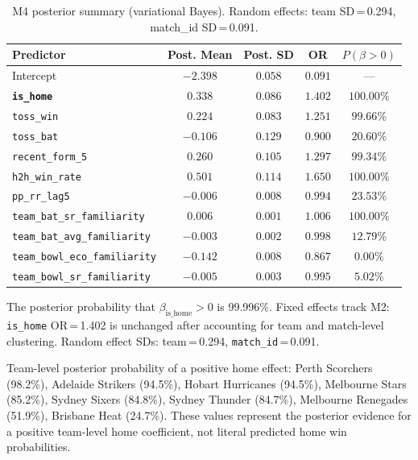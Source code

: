 \documentclass[12pt,a4paper]{article}
\begin{document}
\begin{table}[H]
\centering
\caption{M4 posterior summary (variational Bayes). Random effects: team SD\,=\,0.294, match\_id SD\,=\,0.091.}
\label{tab:m4}
\small
\begin{tabular}{lcccc}
\toprule
\textbf{Predictor} & \textbf{Post. Mean} & \textbf{Post. SD} & \textbf{OR} & \textbf{$P(\beta > 0)$} \\
\midrule
Intercept                            & $-2.398$ & $0.058$ & $0.091$ & --- \\
\textbf{\texttt{is\_home}}           & $\mathbf{0.338}$ & $0.086$ & $\mathbf{1.402}$ & $\mathbf{100.00\%}$ \\
\texttt{toss\_win}                   & $0.224$  & $0.083$ & $1.251$ & $99.66\%$ \\
\texttt{toss\_bat}                   & $-0.106$ & $0.129$ & $0.900$ & $20.60\%$ \\
\texttt{recent\_form\_5}             & $0.260$  & $0.105$ & $1.297$ & $99.34\%$ \\
\texttt{h2h\_win\_rate}              & $0.501$  & $0.114$ & $1.650$ & $100.00\%$ \\
\texttt{pp\_rr\_lag5}                & $-0.006$ & $0.008$ & $0.994$ & $23.53\%$ \\
\texttt{team\_bat\_sr\_familiarity}  & $0.006$  & $0.001$ & $1.006$ & $100.00\%$ \\
\texttt{team\_bat\_avg\_familiarity} & $-0.003$ & $0.002$ & $0.998$ & $12.79\%$ \\
\texttt{team\_bowl\_eco\_familiarity}& $-0.142$ & $0.008$ & $0.867$ & $0.00\%$ \\
\texttt{team\_bowl\_sr\_familiarity} & $-0.005$ & $0.003$ & $0.995$ & $5.02\%$ \\
\bottomrule
\end{tabular}
\end{table}

The posterior probability that $\beta_{\text{is\_home}} > 0$ is 99.996\%. Fixed effects
track M2: \texttt{is\_home} OR\,=\,1.402 is unchanged after accounting for team and
match-level clustering. Random effect SDs: team\,=\,0.294, \texttt{match\_id}\,=\,0.091.

Team-level posterior probability of a positive home effect: Perth Scorchers (98.2\%),
Adelaide Strikers (94.5\%), Hobart Hurricanes (94.5\%), Melbourne Stars (85.2\%), Sydney
Sixers (84.8\%), Sydney Thunder (84.7\%), Melbourne Renegades (51.9\%), Brisbane Heat
(24.7\%). These values represent the posterior evidence for a positive team-level home
coefficient, not literal predicted home win probabilities.
\end{document}
